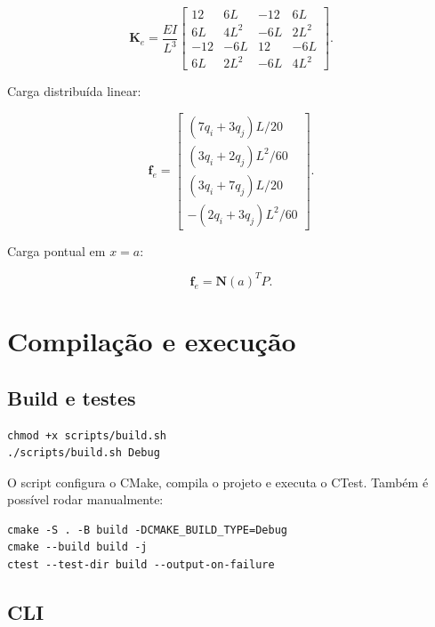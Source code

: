\documentclass[12pt,a4paper]{article}
\begin{document}
\begin{equation}
  \mathbf{K}_e =
  \frac{EI}{L^3}
  \begin{bmatrix}
    12 & 6L & -12 & 6L\\
    6L & 4L^2 & -6L & 2L^2\\
    -12 & -6L & 12 & -6L\\
    6L & 2L^2 & -6L & 4L^2
  \end{bmatrix}.
\end{equation}

Carga distribuída linear:

\begin{equation}
  \mathbf{f}_e =
  \begin{bmatrix}
    (7q_i+3q_j)L/20\\
    (3q_i+2q_j)L^2/60\\
    (3q_i+7q_j)L/20\\
    -(2q_i+3q_j)L^2/60
  \end{bmatrix}.
\end{equation}

Carga pontual em \(x=a\):

\begin{equation}
  \mathbf{f}_e = \mathbf{N}(a)^T P.
\end{equation}

\section{Compilação e execução}
\label{app:execucao}

\subsection{Build e testes}

\begin{verbatim}
chmod +x scripts/build.sh
./scripts/build.sh Debug
\end{verbatim}

O script configura o CMake, compila o projeto e executa o CTest. Também é possível rodar manualmente:

\begin{verbatim}
cmake -S . -B build -DCMAKE_BUILD_TYPE=Debug
cmake --build build -j
ctest --test-dir build --output-on-failure
\end{verbatim}

\subsection{CLI}
\end{document}
